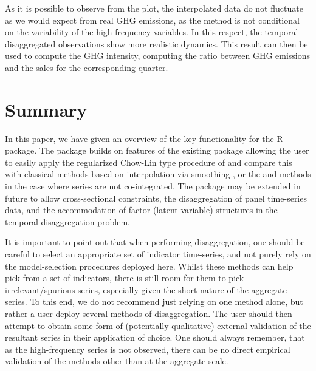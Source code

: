 As it is possible to observe from the plot, the interpolated data do not fluctuate as we would expect from real GHG emissions, as the method is not conditional on the variability of the high-frequency variables. In this respect, the temporal disaggregated observations show more realistic dynamics. This result can then be used to compute the GHG intensity, computing the ratio between GHG emissions and the sales for the corresponding quarter.

\hypertarget{Summary}{%
\section{Summary}\label{Summary}}

In this paper, we have given an overview of the key functionality for the  R package. The package builds on features of the existing  package allowing the user to easily apply the regularized Chow-Lin type procedure of \citet{10-1111rssa-12952} and compare this with classical methods based on interpolation via smoothing \citep[e.g.][]{denton1971adjustment}, or the \citet{fernandez1981methodological} and \citet{fernandez1981methodological} methods in the case where series are not co-integrated. The package may be extended in future to allow cross-sectional constraints, the disaggregation of panel time-series data, and the accommodation of factor (latent-variable) structures in the temporal-disaggregation problem.

It is important to point out that when performing disaggregation, one should be careful to select an appropriate set of indicator time-series, and not purely rely on the model-selection procedures deployed here. Whilst these methods can help pick from a set of indicators, there is still room for them to pick irrelevant/spurious series, especially given the short nature of the aggregate series. To this end, we do not recommend just relying on one method alone, but rather a user deploy several methods of disaggregation. The user should then attempt to obtain some form of (potentially qualitative) external validation of the resultant series in their application of choice. One should always remember, that as the high-frequency series is not observed, there can be no direct empirical validation of the methods other than at the aggregate scale.



\address{%
Luke Mosley\\
Lancaster University\\%
School of Mathematical Sciences\\ Lancaster, United Kingdom\\
%
%
%
\href{mailto:lukemos313@gmail.com}{\nolinkurl{lukemos313@gmail.com}}%
}

